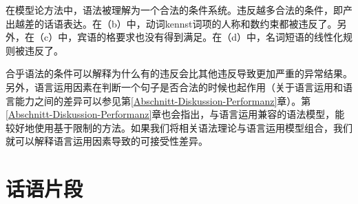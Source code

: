 在模型论方法中，语法被理解为一个合法的条件系统。违反越多合法的条件，即产出越差的话语表达\citep[--27]{PS2001a}。在（b）中，动词kennst词项的人称和数约束都被违反了。另外，在（c）中，宾语的格要求也没有得到满足。在（d）中，名词短语的线性化规则被违反了。

合乎语法的条件可以解释为什么有的违反会比其他违反导致更加严重的异常结果。另外，语言运用因素在判断一个句子是否合法的时候也起作用（关于语言运用和语言能力之间的差异可以参见第\ref{Abschnitt-Diskussion-Performanz}章）。第\ref{Abschnitt-Diskussion-Performanz}章也会指出，与语言运用兼容的语法模型，能较好地使用基于限制的方法。如果我们将相关语法理论与语言运用模型组合，我们就可以解释语言运用因素导致的可接受性差异。

\section{话语片段}

